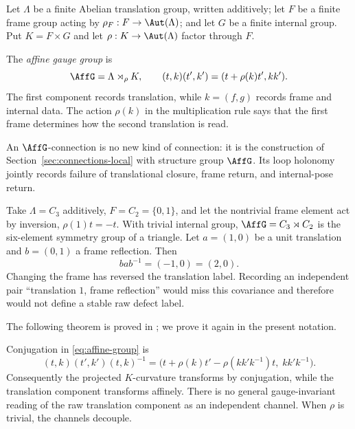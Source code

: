 Let $\Lambda$ be a finite Abelian translation group, written additively;
let $F$ be a finite frame group acting by
$\rho_F:F\to\Aut(\Lambda)$; and let $G$ be a finite internal group.  Put
$K=F\times G$ and let $\rho:K\to\Aut(\Lambda)$ factor through $F$.

\begin{definition}
The \emph{affine gauge group} is
\begin{equation}
\AffG=\Lambda\rtimes_\rho K,
 \qquad
 (t,k)(t',k')=(t+\rho(k)t',kk').
 \label{eq:affine-group}
\end{equation}
The first component records translation, while $k=(f,g)$ records frame and
internal data.  The action $\rho(k)$ in the multiplication rule says that the
first frame determines how the second translation is read.
\end{definition}

An $\AffG$-connection is no new kind of connection: it is the construction
of Section~\ref{sec:connections-local} with structure group $\AffG$.
Its loop holonomy jointly records failure of translational closure, frame
return, and internal-pose return.

\begin{example}
\label{ex:affine-triangle}
Take $\Lambda=C_3$ additively, $F=C_2=\{0,1\}$, and let the nontrivial frame
element act by inversion, $\rho(1)t=-t$.  With trivial internal group,
$\AffG=C_3\rtimes C_2$ is the six-element symmetry group of a triangle.
Let $a=(1,0)$ be a unit translation and $b=(0,1)$ a frame reflection.  Then
\[
 bab^{-1}=(-1,0)=(2,0).
\]
Changing the frame has reversed the translation label.  Recording an
independent pair ``translation $1$, frame reflection'' would miss this
covariance and therefore would not define a stable raw defect label.
\end{example}

The following theorem is proved in \cite{PatternGeometry}; we prove it again
in the present notation.

\begin{theorem}
\label{thm:affine-covariance}
Conjugation in \eqref{eq:affine-group} is
\begin{equation}
(t,k)(t',k')(t,k)^{-1}
 =\bigl(t+\rho(k)t'-\rho(kk'k^{-1})t,\;kk'k^{-1}\bigr).
 \label{eq:affine-conjugation}
\end{equation}
Consequently the projected $K$-curvature transforms by conjugation, while the
translation component transforms affinely.  There is no general
gauge-invariant reading of the raw translation component as an independent
channel.  When $\rho$ is trivial, the channels decouple.
\end{theorem}

